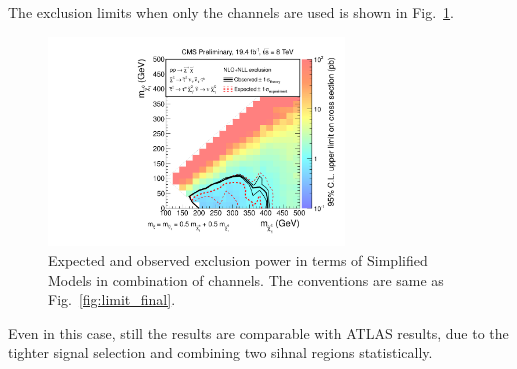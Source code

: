 The exclusion limits when only the \tauTau channels are used is shown in Fig.~\ref{fig:limit_tauTau}.
\begin{linenomath}
\begin{figure}[!Hhtb]
\centering
\includegraphics[width=0.7\textwidth,keepaspectratio=true]{StatisticsFig/ExclusionTauTau2Bin.pdf}
\caption{Expected and observed exclusion power in terms of Simplified Models
in combination of \tauTau channels. The conventions are same as Fig.~\ref{fig:limit_final}.}
\label{fig:limit_tauTau}
\end{figure}
\end{linenomath}
Even in this case, still the results are comparable with ATLAS results, 
due to the tighter signal selection and combining two sihnal regions statistically.


